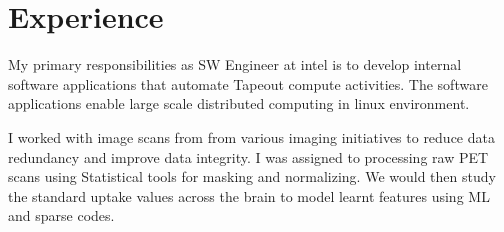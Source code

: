 \documentclass[hidelinks,letterpaper]{deedy-resume-openfont} %
\begin{document}
	\begin{minipage}[t]{0.66\textwidth} %
		
		
		
		\section{Experience}
		
		
		My primary responsibilities as SW Engineer at intel is to develop internal software
		applications that automate Tapeout compute activities. The software applications
		enable large scale distributed computing in linux environment.
		\sectionsep
		
		
		I worked with image scans from from various imaging initiatives to reduce data redundancy and improve data integrity. I was assigned to processing raw PET scans using Statistical tools for masking and normalizing. We would then study the standard uptake values across the brain to model learnt features using ML and sparse codes.
		\sectionsep
		

\end{minipage}
\end{document}
